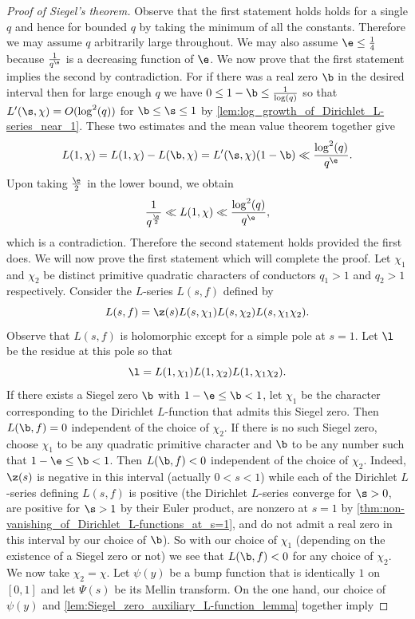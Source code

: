     \begin{proof}[Proof of Siegel's theorem]
      Observe that the first statement holds holds for a single \(q\) and hence for bounded \(q\) by taking the minimum of all the constants. Therefore we may assume \(q\) arbitrarily large throughout. We may also assume \(\e \le \frac{1}{4}\) because \(\frac{1}{q^{\e}}\) is a decreasing function of \(\e\). We now prove that the first statement implies the second by contradiction. For if there was a real zero \(\b\) in the desired interval then for large enough \(q\) we have \(0 \le 1-\b \le \frac{1}{\log(q)}\) so that \(L'(\s,\chi) = O(\log^{2}(q))\) for \(\b \le \s \le 1\) by \cref{lem:log_growth_of_Dirichlet_L-series_near_1}. These two estimates and the mean value theorem together give
      \[
        L(1,\chi) = L(1,\chi)-L(\b,\chi) = L'(\s,\chi)(1-\b) \ll \frac{\log^{2}(q)}{q^{\e}}.
      \]
      Upon taking \(\frac{\e}{2}\) in the lower bound, we obtain
      \[
        \frac{1}{q^{\frac{\e}{2}}} \ll L(1,\chi) \ll \frac{\log^{2}(q)}{q^{\e}},
      \]
      which is a contradiction. Therefore the second statement holds provided the first does. We will now prove the first statement which will complete the proof. Let \(\chi_{1}\) and \(\chi_{2}\) be distinct primitive quadratic characters of conductors \(q_{1} > 1\) and \(q_{2} > 1\) respectively. Consider the \(L\)-series \(L(s,f)\) defined by
      \[
        L(s,f) = \z(s)L(s,\chi_{1})L(s,\chi_{2})L(s,\chi_{1}\chi_{2}).
      \]
      Observe that \(L(s,f)\) is holomorphic except for a simple pole at \(s = 1\). Let \(\l\) be the residue at this pole so that
      \[
        \l = L(1,\chi_{1})L(1,\chi_{2})L(1,\chi_{1}\chi_{2}).
      \]
      If there exists a Siegel zero \(\b\) with \(1-\e \le \b < 1\), let \(\chi_{1}\) be the character corresponding to the Dirichlet \(L\)-function that admits this Siegel zero. Then \(L(\b,f) = 0\) independent of the choice of \(\chi_{2}\). If there is no such Siegel zero, choose \(\chi_{1}\) to be any quadratic primitive character and \(\b\) to be any number such that \(1-\e \le \b < 1\). Then \(L(\b,f) < 0\) independent of the choice of \(\chi_{2}\). Indeed, \(\z(s)\) is negative in this interval (actually \(0 < s < 1\)) while each of the Dirichlet \(L\)-series defining \(L(s,f)\) is positive (the Dirichlet \(L\)-series converge for \(\s > 0\), are positive for \(\s > 1\) by their Euler product, are nonzero at \(s = 1\) by \cref{thm:non-vanishing_of_Dirichlet_L-functions_at_s=1}, and do not admit a real zero in this interval by our choice of \(\b\)). So with our choice of \(\chi_{1}\) (depending on the existence of a Siegel zero or not) we see that \(L(\b,f) < 0\) for any choice of \(\chi_{2}\). We now take \(\chi_{2} = \chi\). Let \(\psi(y)\) be a bump function that is identically \(1\) on \([0,1]\) and let \(\Psi(s)\) be its Mellin transform. On the one hand, our choice of \(\psi(y)\) and \cref{lem:Siegel_zero_auxiliary_L-function_lemma} together imply

\end{proof}
